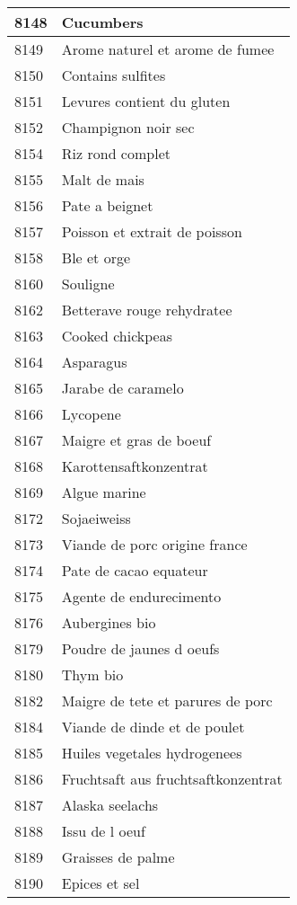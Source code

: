 \begin{longtable}{|l|l|}
8148 & Cucumbers \\ \hline 
8149 & Arome naturel et arome de fumee \\ \hline 
8150 & Contains sulfites \\ \hline 
8151 & Levures contient du gluten \\ \hline 
8152 & Champignon noir sec \\ \hline 
8154 & Riz rond complet \\ \hline 
8155 & Malt de mais \\ \hline 
8156 & Pate a beignet \\ \hline 
8157 & Poisson et extrait de poisson \\ \hline 
8158 & Ble et orge \\ \hline 
8160 & Souligne \\ \hline 
8162 & Betterave rouge rehydratee \\ \hline 
8163 & Cooked chickpeas \\ \hline 
8164 & Asparagus \\ \hline 
8165 & Jarabe de caramelo \\ \hline 
8166 & Lycopene \\ \hline 
8167 & Maigre et gras de boeuf \\ \hline 
8168 & Karottensaftkonzentrat \\ \hline 
8169 & Algue marine \\ \hline 
8172 & Sojaeiweiss \\ \hline 
8173 & Viande de porc origine france \\ \hline 
8174 & Pate de cacao equateur \\ \hline 
8175 & Agente de endurecimento \\ \hline 
8176 & Aubergines bio \\ \hline 
8179 & Poudre de jaunes d oeufs \\ \hline 
8180 & Thym bio \\ \hline 
8182 & Maigre de tete et parures de porc \\ \hline 
8184 & Viande de dinde et de poulet \\ \hline 
8185 & Huiles vegetales hydrogenees \\ \hline 
8186 & Fruchtsaft aus fruchtsaftkonzentrat \\ \hline 
8187 & Alaska seelachs \\ \hline 
8188 & Issu de l oeuf \\ \hline 
8189 & Graisses de palme \\ \hline 
8190 & Epices et sel \\ \hline 

\end{longtable}
